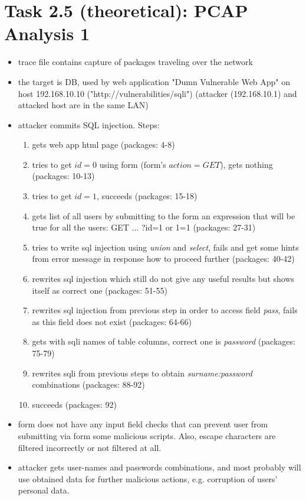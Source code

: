 \documentclass{article}
\begin{document}
\section*{Task 2.5 (theoretical): PCAP Analysis 1}
\begin{itemize}
\item trace file contains capture of packages traveling over the network
\item the target is DB, used by web application "Dumn Vulnerable Web App" on host 192.168.10.10 ("http://vulnerabilities/sqli") (attacker (192.168.10.1) and attacked host are in the same LAN)
\item attacker commits SQL injection. Steps:
\begin{enumerate}
\item gets web app html page (packages: 4-8)
\item tries to get $id=0$ using form (form's $action=GET$), gets nothing (packages: 10-13)
\item tries to get $id=1$, succeeds (packages: 15-18)
\item gets list of all users by submitting to the form an expression that will be true for all the users: GET ... ?id=1 or 1=1 (packages: 27-31)
\item tries to write sql injection using \textit {union} and \textit{select}, fails and get some hints from error message in response how to proceed further (packages: 40-42) 
\item rewrites sql injection which still do not give any useful results but shows itself as correct one (packages: 51-55)
\item rewrites sql injection from previous step in order to access field \textit{pass}, fails as this field does not exist (packages: 64-66)
\item gets with sqli names of table columns, correct one is \textit{password} (packages: 75-79)
\item rewrites sqli from previous steps to obtain \textit{surname:password} combinations (packages: 88-92)
\item succeeds (packages: 92)
\end{enumerate}
\item form does not have any input field checks that can prevent user from submitting via form some malicious scripts. Also, escape characters are filtered incorrectly or not filtered at all.
\item attacker gets user-names and passwords combinations, and most probably will use obtained data for further malicious actions, e.g. corruption of users' personal data.

\end{itemize}
\end{document}
